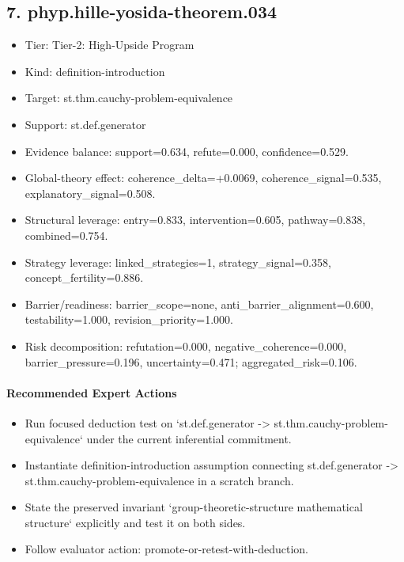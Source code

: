 \documentclass[11pt]{article}
\begin{document}
\subsection*{7. phyp.hille-yosida-theorem.034}
\begin{itemize}
\item Tier: Tier-2: High-Upside Program
\item Kind: definition-introduction
\item Target: st.thm.cauchy-problem-equivalence
\item Support: st.def.generator
\item Evidence balance: support=0.634, refute=0.000, confidence=0.529.
\item Global-theory effect: coherence\_delta=+0.0069, coherence\_signal=0.535, explanatory\_signal=0.508.
\item Structural leverage: entry=0.833, intervention=0.605, pathway=0.838, combined=0.754.
\item Strategy leverage: linked\_strategies=1, strategy\_signal=0.358, concept\_fertility=0.886.
\item Barrier/readiness: barrier\_scope=none, anti\_barrier\_alignment=0.600, testability=1.000, revision\_priority=1.000.
\item Risk decomposition: refutation=0.000, negative\_coherence=0.000, barrier\_pressure=0.196, uncertainty=0.471; aggregated\_risk=0.106.
\end{itemize}
\paragraph{Recommended Expert Actions}
\begin{itemize}
\item Run focused deduction test on `st.def.generator -> st.thm.cauchy-problem-equivalence` under the current inferential commitment.
\item Instantiate definition-introduction assumption connecting st.def.generator -> st.thm.cauchy-problem-equivalence in a scratch branch.
\item State the preserved invariant `group-theoretic-structure mathematical structure` explicitly and test it on both sides.
\item Follow evaluator action: promote-or-retest-with-deduction.
\end{itemize}
\end{document}
